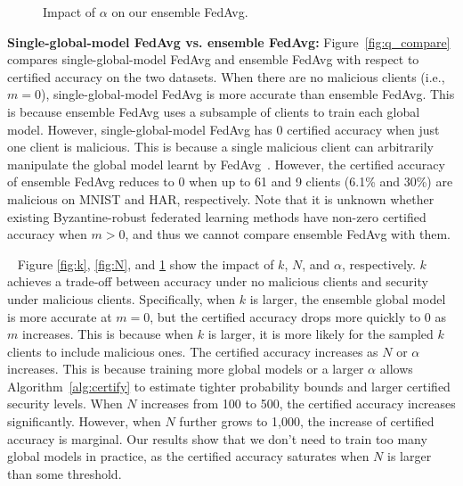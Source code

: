 \documentclass[letterpaper]{article} %
\newcommand{\myparatight}[1]{\smallskip\noindent{\bf {#1}:}~}
\begin{document}
\begin{figure}[!t]
    \center
    \caption{Impact of $\alpha$ on our ensemble FedAvg.}
    \label{fig:alpha}
\end{figure}

\noindent
{\bf Single-global-model FedAvg vs. ensemble FedAvg:} Figure~\ref{fig:q_compare} compares single-global-model FedAvg and ensemble FedAvg with respect to certified accuracy on the two datasets.
When there are no malicious clients (i.e., $m=0$), single-global-model FedAvg is more accurate than ensemble FedAvg. This is because ensemble FedAvg uses a subsample of clients to train each global model.
However, single-global-model FedAvg has 0 certified accuracy when just one client is malicious. This is because a single malicious client can arbitrarily manipulate the global model learnt by FedAvg~\cite{Blanchard17}. However, the certified accuracy of ensemble FedAvg reduces to 0 when up to 61 and 9 clients (6.1\% and 30\%) are malicious on MNIST and HAR, respectively. Note that it is unknown whether existing Byzantine-robust federated learning methods have non-zero certified accuracy when $m>0$, and thus we cannot compare ensemble FedAvg with them.

\myparatight{Impact of $k$, $N$, and $\alpha$} Figure \ref{fig:k}, \ref{fig:N}, and  \ref{fig:alpha} show the impact of $k$, $N$, and $\alpha$, respectively. $k$ achieves a trade-off between accuracy under no malicious clients and security under malicious clients.
Specifically, when $k$ is larger, the ensemble global model is more accurate at $m=0$, but the certified accuracy drops more quickly to 0 as $m$ increases. This is because when $k$ is larger, it is more likely for the sampled $k$ clients to include malicious ones.
The certified accuracy increases as $N$ or $\alpha$ increases. This is because training more global models or a larger $\alpha$ allows Algorithm~\ref{alg:certify} to estimate tighter probability bounds and larger certified security levels. When $N$ increases from 100 to 500,  the certified accuracy increases significantly. However, when $N$ further grows to 1,000, the increase of certified accuracy is marginal. Our results show that  we don't need to train too many global models in practice, as the certified accuracy saturates when $N$ is larger than some threshold.
\end{document}
